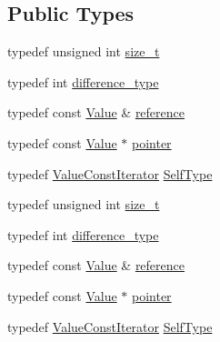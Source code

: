\subsection*{Public Types}
\begin{DoxyCompactItemize}
\item 
typedef unsigned int \hyperlink{classJson_1_1ValueConstIterator_a8685219d214dbd2b763357ae94fb0f27}{size\-\_\-t}
\item 
typedef int \hyperlink{classJson_1_1ValueConstIterator_a32b36aa9d76e2b48ca74fb6e1979a95a}{difference\-\_\-type}
\item 
typedef const \hyperlink{classJson_1_1Value}{Value} \& \hyperlink{classJson_1_1ValueConstIterator_aa9b05c6a37cd352ea1ee6e13b816f709}{reference}
\item 
typedef const \hyperlink{classJson_1_1Value}{Value} $\ast$ \hyperlink{classJson_1_1ValueConstIterator_a400136bd8bc09e9fddec0785fa2cff14}{pointer}
\item 
typedef \hyperlink{classJson_1_1ValueConstIterator}{Value\-Const\-Iterator} \hyperlink{classJson_1_1ValueConstIterator_a0c2e33e7eb5a80dd8709fb28ece83933}{Self\-Type}
\item 
typedef unsigned int \hyperlink{classJson_1_1ValueConstIterator_a8685219d214dbd2b763357ae94fb0f27}{size\-\_\-t}
\item 
typedef int \hyperlink{classJson_1_1ValueConstIterator_a32b36aa9d76e2b48ca74fb6e1979a95a}{difference\-\_\-type}
\item 
typedef const \hyperlink{classJson_1_1Value}{Value} \& \hyperlink{classJson_1_1ValueConstIterator_aa9b05c6a37cd352ea1ee6e13b816f709}{reference}
\item 
typedef const \hyperlink{classJson_1_1Value}{Value} $\ast$ \hyperlink{classJson_1_1ValueConstIterator_a400136bd8bc09e9fddec0785fa2cff14}{pointer}
\item 
typedef \hyperlink{classJson_1_1ValueConstIterator}{Value\-Const\-Iterator} \hyperlink{classJson_1_1ValueConstIterator_a0c2e33e7eb5a80dd8709fb28ece83933}{Self\-Type}
\end{DoxyCompactItemize}
